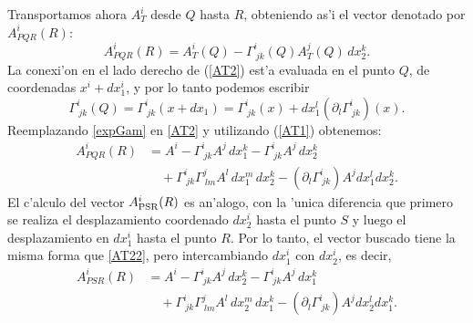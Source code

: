 Transportamos ahora $A_{T}^i $ desde $Q$ hasta $R$, obteniendo as'i el vector denotado por $A_{PQR}^i (R)$:
\begin{equation}
A_{PQR}^i (R) = A_{T}^i (Q) -\Gamma_{\ jk}^i(Q)A_{T}^j (Q)\,dx_2^k. \label{AT2}%
\end{equation}
 La conexi'on en el lado derecho de (\ref{AT2}) est'a evaluada en el punto $Q$, de coordenadas $x^i +dx_1^i$, y por lo tanto podemos escribir
\begin{equation}
\Gamma_{\ jk}^i(Q)=\Gamma_{\ jk}^i (x+dx_1)=\Gamma_{\ jk}^i(x)+dx_1^l(\partial_l\Gamma_{\ jk}^i) (x) . \label{expGam}
\end{equation}
Reemplazando \eqref{expGam} en \eqref{AT2} y utilizando (\ref{AT1}) obtenemos:%
\begin{align}
A_{PQR}^i (R) &= A^i -\Gamma_{\ jk}^i A^j\,dx_1^k-\Gamma_{\ jk}^i A^j\,dx_2^k \nonumber\\
& \quad  +\Gamma_{\ jk}^i \Gamma_{\ lm}^jA^l\, dx_1^m\,dx_2^k -(\partial_l\Gamma_{\ jk}^i) A^j dx_1^l dx_2^k. \label{AT22}
\end{align}
El c'alculo del vector $A_{\rm PSR}^i(R)$ es an'alogo, con la 'unica diferencia que primero se realiza el desplazamiento coordenado $dx_2^i$ hasta el punto $S$ y luego el desplazamiento en $dx_1^i$ hasta el punto $R$. Por lo tanto, el vector buscado tiene la misma forma que \eqref{AT22}, pero intercambiando $dx_1^i$ con $dx_2^i$, es decir,
\begin{align}
A_{PSR}^i (R) &= A^i -\Gamma_{\ jk}^i A^j\,dx_2^k-\Gamma_{\ jk}^i A^j\,dx_1^k \nonumber\\
& \quad  +\Gamma_{\ jk}^i \Gamma_{\ lm}^jA^l\, dx_2^m\,dx_1^k -(\partial_l\Gamma_{\ jk}^i) A^j dx_2^l dx_1^k. \label{APSR}
\end{align}

